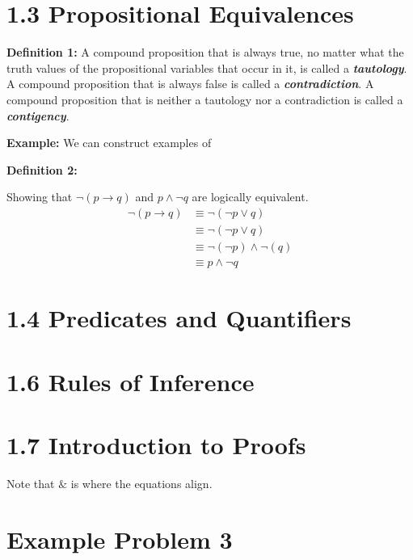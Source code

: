 \documentclass[12pt,letterpaper]{article}
\begin{document}
\section*{1.3 Propositional Equivalences}

\textbf{Definition 1:} A compound proposition that is always true, no matter what the truth values of the propositional variables that occur in it, is called a \textbf{\textit{tautology}}. A compound proposition that is always false is called a \textbf{\textit{contradiction}}. A compound proposition that is neither a tautology nor a contradiction is called a \textbf{\textit{contigency}}.

\textbf{Example:}
We can construct examples of

\textbf{Definition 2:}

Showing that $\neg (p \rightarrow q)$ and  $p \wedge \neg q$ are logically equivalent.
\begin{align*}
   \neg (p \rightarrow q)   & \equiv \neg ( \neg p \vee q ) \\ %
                            & \equiv \neg ( \neg p \vee q ) \\
                            & \equiv \neg ( \neg p ) \wedge \neg ( q ) \\
                            & \equiv p \wedge \neg q
\end{align*}




\section*{1.4 Predicates and Quantifiers}



\section*{1.6 Rules of Inference}



\section*{1.7 Introduction to Proofs}




Note that $\&$ is where the equations align.

\section*{Example Problem 3}
\end{document}
